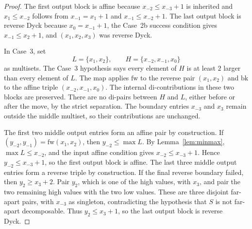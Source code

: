 \documentclass[11pt]{article}
\theoremstyle{plain}
\theoremstyle{definition}
\theoremstyle{remark}
\newcommand{\di}{\mathrm{di}}
\begin{document}
\begin{proof}
The first output block is affine because \(x_{-2}\le x_{-3}+1\) is inherited
and \(x_1\le x_{-2}\) follows from \(x_{-1}=x_1+1\) and
\(x_{-1}\le x_{-2}+1\). The last output block is reverse Dyck because
\(x_0=x_{-1}+1\), the Case~2b success condition gives
\(x_{-1}\le x_2+1\), and \((x_1,x_2,x_3)\) was reverse Dyck.

In Case~3, set
\[
  L=\{x_1,x_2\},
  \qquad
  H=\{x_{-2},x_{-1},x_0\}
\]
as multisets. The Case~3 hypothesis says every element of \(H\) is at least
\(2\) larger than every element of \(L\). The map applies \(\mathrm{fw}\) to
the reverse pair \((x_1,x_2)\) and \(\mathrm{bk}\) to the affine triple
\((x_{-2},x_{-1},x_0)\). The internal \(\di\)-contributions in these two
blocks are preserved. There are no \(\di\)-pairs between \(H\) and \(L\), either
before or after the move, by the strict separation. The boundary entries
\(x_{-3}\) and \(x_3\) remain outside the middle multiset, so their
contributions are unchanged.

The first two middle output entries form an affine pair by construction. If
\((y_{-2},y_{-1})=\mathrm{fw}(x_1,x_2)\), then
\(y_{-2}\le \max L\). By Lemma~\ref{lem:minmax}, \(\max L\le x_{-2}\), and the
input affine condition gives \(x_{-2}\le x_{-3}+1\). Hence
\(y_{-2}\le x_{-3}+1\), so the first output block is affine. The last three
middle output entries form a reverse triple by construction. If the final
reverse boundary failed, then \(y_2\ge x_3+2\). Pair \(y_2\), which is one of
the high values, with \(x_3\), and pair the two remaining high values with the
two low values. These are three disjoint far-apart pairs, with \(x_{-3}\) as
singleton, contradicting the hypothesis that \(S\) is not far-apart
decomposable. Thus \(y_2\le x_3+1\), so the last output block is reverse Dyck.


\end{proof}
\end{document}
